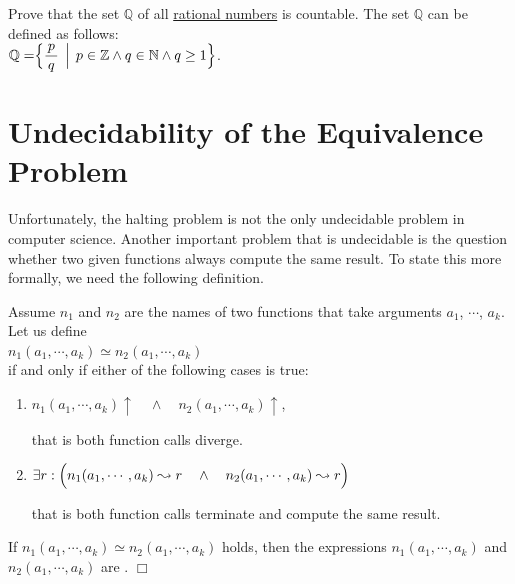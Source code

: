 \exerciseEng
Prove that the set $\mathbb{Q}$ of all \href{https://en.wikipedia.org/wiki/Rational_number}{rational numbers}
is countable.  The set $\mathbb{Q}$ can be defined as follows: 
\\[0.2cm]
\hspace*{1.3cm}
$\displaystyle \mathbb{Q} = \Bigr\{ \frac{\,p\,}{q} \,\Bigm|\, p \in \mathbb{Z} \wedge q \in \mathbb{N} \wedge q
\geq 1 \Bigr\}$.



\section[The Equivalence Problem]{Undecidability of the Equivalence Problem}
Unfortunately, the halting problem is not the only undecidable problem in computer science.  Another
important problem that is undecidable is the question whether two given functions always compute the
same result.  To state this more formally, we need the following definition.


\begin{Definition}[$\simeq$] 
Assume $n_1$ and $n_2$ are the names of two \Fsharp{} functions that take arguments
  $a_1$, $\cdots$, $a_k$.  Let us define \\[0.2cm]
\hspace*{1.3cm} 
$n_1(a_1,\cdots,a_k) \simeq n_2(a_1,\cdots,a_k)$ 
\\[0.2cm]
if and only if either of the following cases is true:
\begin{enumerate}
\item $n_1(a_1,\cdots,a_k)\uparrow \quad\wedge\quad n_2(a_1,\cdots,a_k)\uparrow$,

      that is both function calls diverge.
\item $\exists r: \Bigl(n_1(a_1,\cdots,a_k) \leadsto r \quad\wedge\quad n_2(a_1,\cdots,a_k) \leadsto
  r\Bigr)$

      that is both function calls terminate and compute the same result.
\end{enumerate}
If $n_1(a_1,\cdots,a_k) \simeq n_2(a_1,\cdots,a_k)$ holds, then the expressions $n_1(a_1,\cdots,a_k)$ and $n_2(a_1,\cdots,a_k)$ are 
. 
\hspace*{\fill} $\Box$
\end{Definition}

